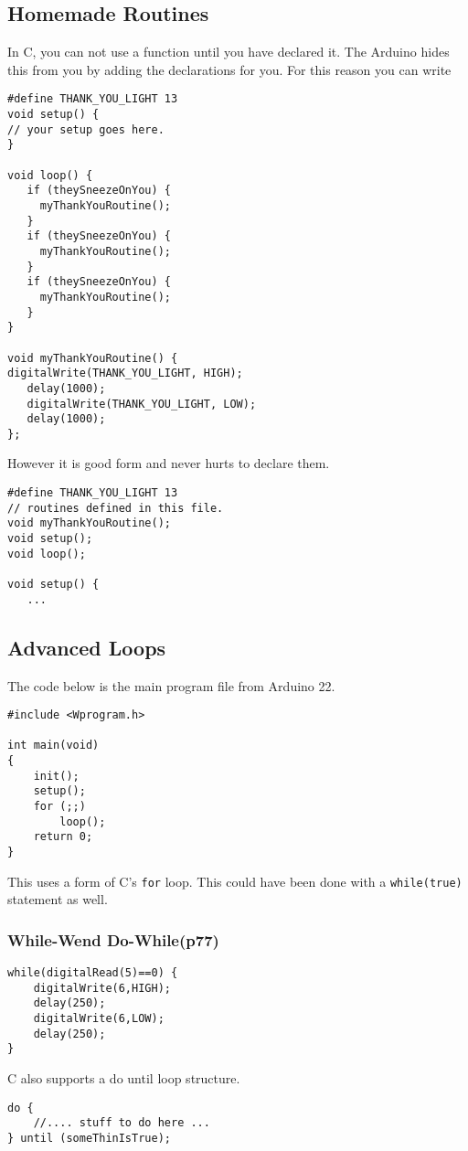 \documentclass{book}
\begin{document}
\subsection{Homemade Routines}
In C, you can not use a function until you have declared it. The Arduino hides this from you by adding the declarations for you. For this reason you can write
\begin{verbatim}
#define THANK_YOU_LIGHT 13
void setup() {
// your setup goes here. 
}

void loop() {
   if (theySneezeOnYou) {
     myThankYouRoutine();
   }
   if (theySneezeOnYou) {
     myThankYouRoutine();
   }
   if (theySneezeOnYou) {
     myThankYouRoutine();
   }
}

void myThankYouRoutine() {
digitalWrite(THANK_YOU_LIGHT, HIGH);
   delay(1000);
   digitalWrite(THANK_YOU_LIGHT, LOW);
   delay(1000);
};
\end{verbatim}

However it is good form and never hurts to declare them.
\begin{verbatim}
#define THANK_YOU_LIGHT 13
// routines defined in this file.
void myThankYouRoutine();
void setup();
void loop();

void setup() {
   ...
\end{verbatim}

\subsection{Advanced Loops}
The code below is the main program file from Arduino 22.
\begin{verbatim}
#include <Wprogram.h>

int main(void)
{
    init();
    setup();
    for (;;)
        loop();
    return 0;
}
\end{verbatim}
This uses a form of C's \verb|for| loop. This could have been done with a \verb|while(true)| statement as well.

\subsubsection{While-Wend Do-While(p77)}
\begin{verbatim}
while(digitalRead(5)==0) {
    digitalWrite(6,HIGH);
    delay(250);
    digitalWrite(6,LOW);
    delay(250);
}
\end{verbatim}
C also supports a do until loop structure.
\begin{verbatim}
do {
    //.... stuff to do here ...
} until (someThinIsTrue);
\end{verbatim}
\end{document}
